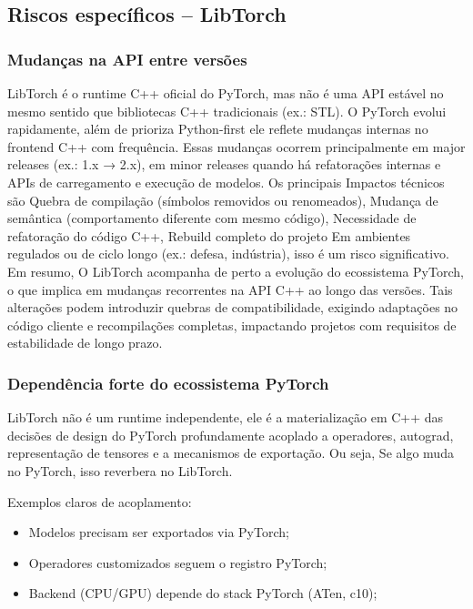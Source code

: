 \subsection{Riscos específicos – LibTorch}

\subsubsection{Mudanças na API entre versões}

LibTorch é o runtime C++ oficial do PyTorch, mas não é uma API estável no mesmo sentido que bibliotecas C++ tradicionais (ex.: STL). O PyTorch evolui rapidamente, além de prioriza Python-first ele reflete mudanças internas no frontend C++ com frequência. 
Essas mudanças ocorrem principalmente em major releases (ex.: 1.x → 2.x), em minor releases quando há refatorações internas e APIs de carregamento e execução de modelos.
Os principais Impactos técnicos são Quebra de compilação (símbolos removidos ou renomeados), Mudança de semântica (comportamento diferente com mesmo código), Necessidade de refatoração do código C++, Rebuild completo do projeto Em ambientes regulados ou de ciclo longo (ex.: defesa, indústria), isso é um risco significativo.
Em resumo, O LibTorch acompanha de perto a evolução do ecossistema PyTorch, o que implica em mudanças recorrentes na API C++ ao longo das versões. Tais alterações podem introduzir quebras de compatibilidade, exigindo adaptações no código cliente e recompilações completas, impactando projetos com requisitos de estabilidade de longo prazo.

\subsubsection{Dependência forte do ecossistema PyTorch}

LibTorch não é um runtime independente, ele é a materialização em C++ das decisões de design do PyTorch profundamente acoplado a operadores, autograd, representação de tensores e a mecanismos de exportação. Ou seja, Se algo muda no PyTorch, isso reverbera no LibTorch.

Exemplos claros de acoplamento:

\begin{itemize} 
    \item Modelos precisam ser exportados via PyTorch;
    \item Operadores customizados seguem o registro PyTorch;
    \item Backend (CPU/GPU) depende do stack PyTorch (ATen, c10);
\end{itemize}

